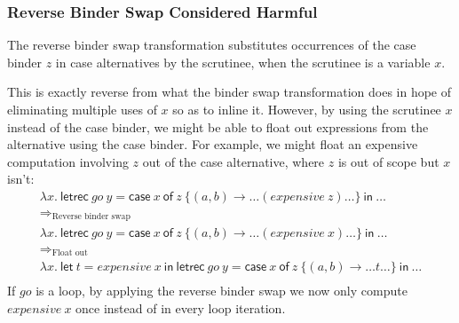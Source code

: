 \documentclass[acmsmall,review]{acmart}
\newcommand{\llet}[2]{\mathsf{let}~#1~\mathsf{in}~#2}
\newcommand{\lletrec}[2]{\mathsf{letrec}~#1~\mathsf{in}~#2}
\newcommand{\ccase}[2]{\mathsf{case}~#1~\mathsf{of}~#2}
\begin{document}
% 

\subsubsection{Reverse Binder Swap Considered Harmful\label{sec:reverse-binder-swap-considered-harmful}}

The reverse binder swap transformation substitutes occurrences of the case
binder $z$ in case alternatives by the scrutinee, when the scrutinee is a
variable $x$.

\ReverseBinderSwapTheorem

\noindent This is exactly reverse from what the binder swap transformation
does in hope of eliminating multiple uses of $x$ so as to inline it. However, by
using the scrutinee $x$ instead of the case binder, we might be able to float
out expressions from the alternative using the case binder. For example, we
might float an expensive computation involving $z$ out of the case alternative,
where $z$ is out of scope but $x$ isn't:
\[
\begin{array}{l}
\lambda x.~\lletrec{go~y = \ccase{x}{z~\{(a,b) \to \dots (expensive~z) \dots\} }}{\dots}\\
\Longrightarrow_\textrm{Reverse binder swap}\\
\lambda x.~\lletrec{go~y = \ccase{x}{z~\{(a,b) \to \dots (expensive~x) \dots\} }}{\dots}\\
\Longrightarrow_\textrm{Float out}\\
\lambda x.~\llet{t = expensive~x}{\lletrec{go~y = \ccase{x}{z~\{(a,b) \to \dots t \dots\} }}{\dots}}\\
\end{array}
\]
If $go$ is a loop, by applying the reverse binder swap we now only compute
$expensive~x$ once instead of in every loop iteration.
\end{document}
